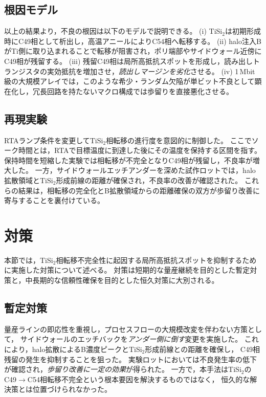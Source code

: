 \documentclass[conference]{IEEEtran}
\begin{document}
\subsection{根因モデル}
以上の結果より，不良の根因は以下のモデルで説明できる。  
(i) TiSi$_2$は初期形成時にC49相として析出し，高温アニールによりC54相へ転移する。  
(ii) halo注入BがTi側に取り込まれることで転移が阻害され，ポリ端部やサイドウォール近傍にC49相が残留する。  
(iii) 残留C49相は局所高抵抗スポットを形成し，読み出しトランジスタの実効抵抗を増加させ，\emph{読出しマージンを劣化}させる。  
(iv) 1\,Mbit級の大規模アレイでは，このような希少・ランダム欠陥が単ビット不良として顕在化し，冗長回路を持たないマクロ構成では歩留りを直接悪化させる。

\subsection{再現実験}
RTAランプ条件を変更してTiSi$_2$相転移の進行度を意図的に制御した。  
ここでソーク時間とは，RTAで目標温度に到達した後にその温度を保持する区間を指す。  
保持時間を短縮した実験では相転移が不完全となりC49相が残留し，不良率が増大した。  
一方，サイドウォールエッチアンダーを深めた試作ロットでは，halo拡散領域とTiSi$_2$形成前線の距離が確保され，不良率の改善が確認された。  
これらの結果は，相転移の完全化とB拡散領域からの距離確保の双方が歩留り改善に寄与することを裏付けている。

\section{対策}
本節では，TiSi$_2$相転移不完全性に起因する局所高抵抗スポットを抑制するために実施した対策について述べる。  
対策は短期的な量産継続を目的とした暫定対策と，中長期的な信頼性確保を目的とした恒久対策に大別される。

\subsection{暫定対策}
量産ラインの即応性を重視し，プロセスフローの大規模改変を伴わない方策として，
サイドウォールのエッチバックを\emph{アンダー側に倒す}変更を実施した。  
これにより，halo拡散によるB濃度ピークとTiSi$_2$形成前線との距離を確保し，
C49相残留の発生を抑制することを狙った。  
実験ロットにおいては不良発生率の低下が確認され，\emph{歩留り改善に一定の効果}が得られた。  
一方で，本手法はTiSi$_2$のC49$\to$C54相転移不完全という根本要因を解決するものではなく，
恒久的な解決策とは位置づけられなかった。
\end{document}
